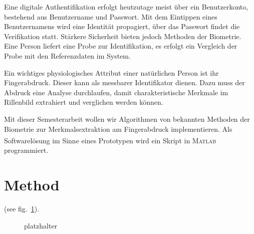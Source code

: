 \documentclass[
    a4paper
    ,twoside
    ,notitlepage	%
  ]{article}
\newcommand{\matlab}{{\small\textsc{Matlab}\textsuperscript{{\tiny\textregistered}} }}
\begin{document}
\begin{multicols*}{2}
% 
Eine digitale Authentifikation erfolgt heutzutage meist \"uber ein Benutzerkonto, bestehend aus Benutzername und Passwort. Mit dem Eintippen eines Benutzernamens wird eine Identit\"at propagiert, \"uber das Passwort findet die Verifikation statt. St\"arkere Sicherheit bieten jedoch Methoden der Biometrie. Eine Person liefert eine Probe zur Identifikation, es erfolgt ein Vergleich der Probe mit den Referenzdaten im System. 

Ein wichtiges physiologisches Attribut einer nat\"urlichen Person ist ihr Fingerabdruck. Dieser kann als messbarer Identifikator dienen. Dazu muss der Abdruck eine Analyse durchlaufen, damit charakteristische Merkmale im Rillenbild extrahiert und verglichen werden k\"onnen. 

Mit dieser Semesterarbeit wollen wir Algorithmen von bekannten Methoden der Biometrie zur Merkmalsextraktion am Fingerabdruck implementieren. Als Softwarel\"osung im Sinne eines Prototypen wird ein Skript in \matlab programmiert. 
    
\section*{Method}
(see fig.~\ref{fig:platzhalter}).
\begin{figure}[H]
  \centering
  \caption{platzhalter}
  \label{fig:platzhalter}
\end{figure}


\end{multicols*}
\end{document}
